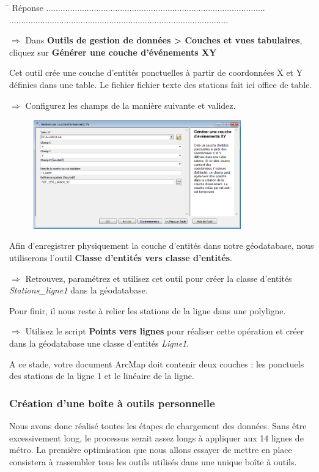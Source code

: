 \documentclass[11pt]{article}
\newcommand{\action}{$\Rightarrow$ }
\newcommand{\reponse}{
	\begin{tabbing}
	\hspace{2cm}\=\kill
	Réponse \> ............................................................................................ \\
 	\> ............................................................................................
	\end{tabbing}
}
\begin{document}
\reponse

\action Dans \textbf{Outils de gestion de données > Couches et vues tabulaires}, cliquez sur \textbf{Générer une couche d'événements XY}

Cet outil crée une couche d'entités ponctuelles à partir de coordonnées X et Y définies dans une table. Le fichier fichier texte des stations fait ici office de table.

\action Configurez les champs de la manière suivante et validez.
\begin{figure}[H]
	\center \includegraphics[width=0.8\textwidth]{img/td3/toolbox_generer_xy.png}\\
\end{figure}

Afin d'enregistrer physiquement la couche d'entités dans notre géodatabase, nous utiliserons l'outil \textbf{Classe d'entités vers classe d'entités}.

\action Retrouvez, paramétrez et utilisez cet outil pour créer la classe d'entités \textit{Stations\_ligne1} dans la géodatabase.

Pour finir, il nous reste à relier les stations de la ligne dans une polyligne.

\action Utilisez le script \textbf{Points vers lignes} pour réaliser cette opération et créer dans la géodatabase une classe d'entités \textit{Ligne1}.

A ce stade, votre document ArcMap doit contenir deux couches : les ponctuels des stations de la ligne 1 et le linéaire de la ligne.


\subsubsection{Création d'une boîte à outils personnelle}
Nous avons donc réalisé toutes les étapes de chargement des données. Sans être excessivement long, le processus serait assez longs à appliquer aux 14 lignes de métro. La première optimisation que nous allons essayer de mettre en place consistera à rassembler tous les outils utilisés dans une unique boîte à outils.
\end{document}
